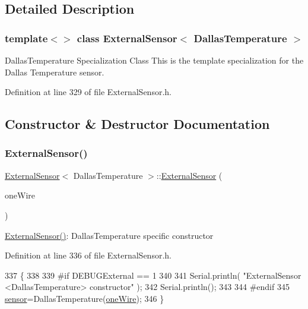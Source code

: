 \subsection{Detailed Description}
\subsubsection*{template$<$$>$\newline
class External\+Sensor$<$ Dallas\+Temperature $>$}

Dallas\+Temperature Specialization Class This is the template specialization for the Dallas Temperature sensor. 

Definition at line 329 of file External\+Sensor.\+h.



\subsection{Constructor \& Destructor Documentation}
\mbox{\label{class_external_sensor_3_01_dallas_temperature_01_4_a5de0c37120d2d927bd0f37ff4a215baf}} 
\subsubsection{\texorpdfstring{External\+Sensor()}{ExternalSensor()}}
{\footnotesize\ttfamily \hyperlink{class_external_sensor}{External\+Sensor}$<$ Dallas\+Temperature $>$\+::\hyperlink{class_external_sensor}{External\+Sensor} (\begin{DoxyParamCaption}\item[{One\+Wire $\ast$}]{one\+Wire }\end{DoxyParamCaption})\hspace{0.3cm}{\ttfamily [inline]}}

\hyperlink{class_external_sensor_3_01_dallas_temperature_01_4_a5de0c37120d2d927bd0f37ff4a215baf}{External\+Sensor()}\+: Dallas\+Temperature specific constructor 

Definition at line 336 of file External\+Sensor.\+h.


\begin{DoxyCode}
337     \{
338         
339 \textcolor{preprocessor}{    #if DEBUGExternal == 1 }
340 
341         Serial.println( \textcolor{stringliteral}{"ExternalSensor <DallasTemperature> constructor"} );
342         Serial.println();
343     
344 \textcolor{preprocessor}{    #endif}
345         \hyperlink{class_external_sensor_3_01_dallas_temperature_01_4_adb6ba4fcdedef95ad8f6b0c9b6c0f9d1}{sensor}=DallasTemperature(\hyperlink{_external_sensors_8cpp_af39fa3dad1ba161b384c0b26b8145e65}{oneWire});
346     \}
\end{DoxyCode}


